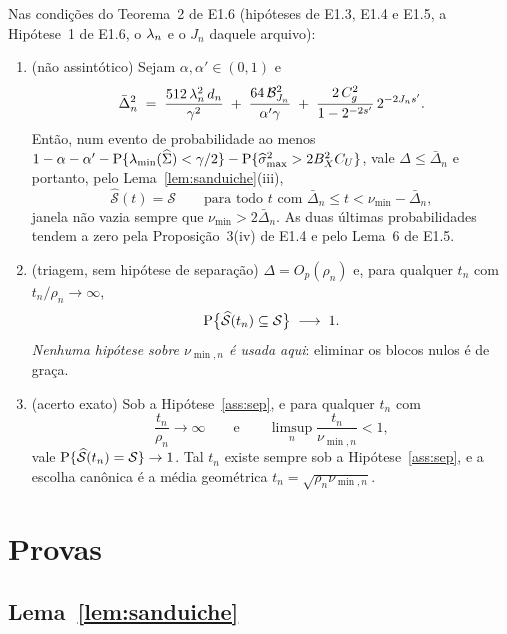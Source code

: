 \documentclass[11pt,a4paper]{article}
\newcommand{\lmin}{\lambda_{\min}}
\newcommand{\smax}{\widehat{\sigma}_{\max}}
\newcommand{\Shat}{\widehat{\mathcal{S}}}
\newcommand{\sepmin}{\nu_{\min}}
\newcommand{\sepminn}{\nu_{\min,n}}
\newcommand{\rn}{\rho}
\begin{document}
\begin{corollary}\label{cor:limiar}
Nas condições do Teorema~2 de E1.6 (hipóteses de E1.3, E1.4 e E1.5, a
Hipótese~1 de E1.6, o $\lambda_{n}$ e o
$J_{n}$ daquele arquivo):
\begin{enumerate}[label=\textup{(\roman*)}, leftmargin=*]
  \item \textup{(não assintótico)} Sejam $\alpha,\alpha'\in(0,1)$ e
    \begin{equation}
      \label{eq:Dn}
      \bar{\Delta}_{n}^{2}
      \;=\; \frac{512\,\lambda_{n}^{2}\,d_{n}}{\gamma^{2}}
      \;+\; \frac{64\,\mathcal{B}_{J_{n}}^{2}}{\alpha'\gamma}
      \;+\; \frac{2\,C_{g}^{2}}{1-2^{-2s'}}\,2^{-2J_{n}s'} .
    \end{equation}
    Então, num evento de probabilidade ao menos
    $1-\alpha-\alpha'-\Prob\{\lmin(\Gramhat)<\gamma/2\}
    -\Prob\{\smax^{2}>2B_{X}^{2}C_{U}\}$, vale $\Delta \le \bar{\Delta}_{n}$ e portanto,
    pelo Lema~\ref{lem:sanduiche}(iii),
    \[
      \Shat(t) = \mathcal{S} \qquad\text{para todo } t \text{ com }
      \bar{\Delta}_{n} \le t < \sepmin - \bar{\Delta}_{n} ,
    \]
    janela não vazia sempre que $\sepmin > 2\bar{\Delta}_{n}$. As duas últimas
    probabilidades tendem a zero pela Proposição~3(iv) de E1.4 e pelo Lema~6
    de E1.5.
  \item \textup{(triagem, sem hipótese de separação)} $\Delta = O_{p}(\rn_{n})$
    e, para qualquer $t_{n}$ com $t_{n}/\rn_{n} \to \infty$,
    \[
      \Prob\bigl\{\Shat(t_{n}) \subseteq \mathcal{S}\bigr\} \;\longrightarrow\; 1 .
    \]
    \emph{Nenhuma hipótese sobre $\sepminn$ é usada aqui}: eliminar os
    blocos nulos é de graça.
  \item \textup{(acerto exato)} Sob a Hipótese~\ref{ass:sep}, e para qualquer
    $t_{n}$ com
    \[
      \frac{t_{n}}{\rn_{n}} \to \infty
      \qquad\text{e}\qquad
      \limsup_{n} \frac{t_{n}}{\sepminn} < 1 ,
    \]
    vale $\Prob\{\Shat(t_{n}) = \mathcal{S}\} \to 1$. Tal $t_{n}$ existe sempre sob a
    Hipótese~\ref{ass:sep}, e a escolha canônica é a média geométrica
    $t_{n} = \sqrt{\rn_{n}\sepminn}$.
\end{enumerate}
\end{corollary}

\section{Provas}

\subsection*{Lema~\ref{lem:sanduiche}}
\end{document}
